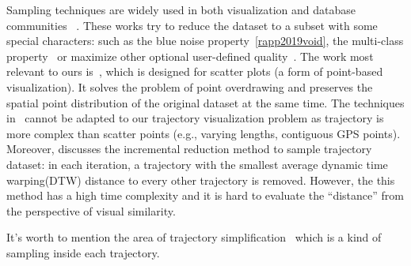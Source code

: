 Sampling techniques are widely used in both visualization and database communities ~\cite{battle2013dynamic,rapp2019void, chen2014visual,yu2020turbocharging,park2016visualization,qin2020making,DBLP:conf/sigmod/DingHCC016,DBLP:journals/pvldb/KimBPIMR15}.
These works try to reduce the dataset to a subset with some special characters: such as the blue noise property~\ref{rapp2019void}, the multi-class property~\cite{chen2014visual} or maximize other optional user-defined quality~\cite{chen2014visual}. 
The work most relevant to ours is~\cite{park2016visualization}, which is designed for scatter plots (a form of point-based visualization). It solves the problem of point overdrawing and preserves the spatial point distribution of the original dataset at the same time. The techniques in~\cite{park2016visualization} cannot be adapted to our trajectory visualization problem
as trajectory is more complex than scatter points (e.g., varying lengths, contiguous GPS points).  Moreover, \cite{borcan2012improving} discusses the incremental reduction method to sample trajectory dataset: in each iteration, a trajectory with the smallest average dynamic time warping(DTW) distance to every other trajectory is removed. However, the this method has a high time complexity and it is hard to evaluate the ``distance'' from the perspective of visual similarity. 

It's worth to mention the area of trajectory simplification~\cite{} which is a kind of sampling inside each trajectory. 




